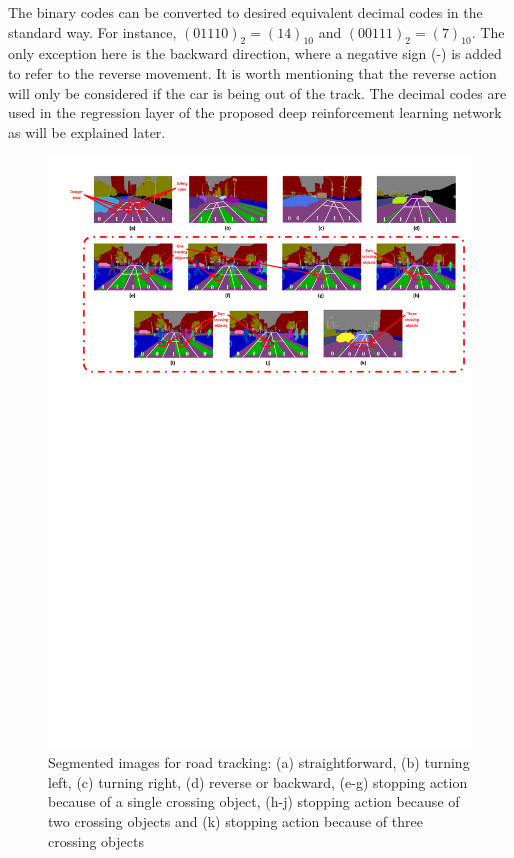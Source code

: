 \documentclass{svproc}
\begin{document}
	The binary codes can be converted to desired equivalent decimal codes in the standard way. For instance, $(01110)_2=(14)_{10}$ and $(00111)_2=(7)_{10}$. The only exception here is the backward direction, where a negative sign (-) is added to refer to the reverse movement. It is worth mentioning that the reverse action will only be considered if the car is being out of the track. The decimal codes are used in the regression layer of the proposed deep reinforcement learning network as will be explained later. 
	\begin{figure}[!ht]
		\centering
		\includegraphics[scale=.33,trim=2cm 35cm 0cm 2cm,clip]{segmentation3.pdf}			
		\begin{scriptsize}\vspace{-4ex}\caption{Segmented images for road tracking: (a) straightforward, (b) turning left, (c) turning right, (d) reverse or backward, (e-g) stopping action because of a single crossing object, (h-j) stopping action because of two crossing objects and (k) stopping action because of three crossing objects}\end{scriptsize}
		\label{Fig:segmentation}
	\end{figure}
\end{document}
